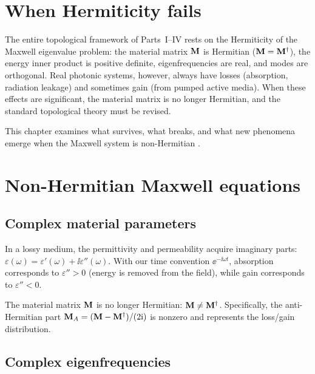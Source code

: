 
\section{When Hermiticity fails}
\label{sec:ch17-fails}

The entire topological framework of Parts~I--IV rests on the Hermiticity
of the Maxwell eigenvalue problem: the material matrix $\mathbf{M}$ is
Hermitian ($\mathbf{M}=\mathbf{M}^\dagger$), the energy inner product is positive
definite, eigenfrequencies are real, and modes are orthogonal.  Real
photonic systems, however, always have losses (absorption, radiation
leakage) and sometimes gain (from pumped active media).  When these
effects are significant, the material matrix is no longer Hermitian, and
the standard topological theory must be revised.

This chapter examines what survives, what breaks, and what new
phenomena emerge when the Maxwell system is non-Hermitian
\cite{gong2018topologicala,ozawa2018topological}.

\section{Non-Hermitian Maxwell equations}
\label{sec:ch17-nh-maxwell}

\subsection{Complex material parameters}
\label{sec:ch17-complex}

In a lossy medium, the permittivity and permeability acquire imaginary
parts: $\varepsilon(\omega)=\varepsilon'(\omega)+\ii\varepsilon''(\omega)$.
With our time convention $\ee^{-\ii\omega t}$, absorption corresponds
to $\varepsilon''>0$ (energy is removed from the field), while gain
corresponds to $\varepsilon''<0$.

The material matrix $\mathbf{M}$ is no longer Hermitian:
$\mathbf{M}\neq\mathbf{M}^\dagger$.  Specifically, the anti-Hermitian part
$\mathbf{M}_A=(\mathbf{M}-\mathbf{M}^\dagger)/(2\mathrm{i})$ is nonzero and represents
the loss/gain distribution.

\subsection{Complex eigenfrequencies}
\label{sec:ch17-complex-eigenfreq}

